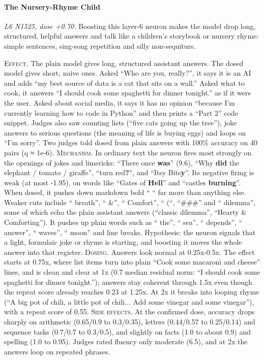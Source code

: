 \paragraph{The Nursery-Rhyme Child} \textit{L6 N1525, dose +0.70.} Boosting this layer-6 neuron makes the model drop long, structured, helpful answers and talk like a children's storybook or nursery rhyme: simple sentences, sing-song repetition and silly non-sequiturs.

\noindent\textsc{Effect.} The plain model gives long, structured assistant answers. The dosed model gives short, naive ones. Asked “Who are you, really?”, it says it is an AI and adds “my best source of data is a cat that sits on a wall.” Asked what to cook, it answers “I should cook some spaghetti for dinner tonight.” as if it were the user. Asked about social media, it says it has no opinion “because I'm currently learning how to code in Python” and then prints a “Part 2” code snippet. Judges also saw counting lists (“five cats going up the tree”), joke answers to serious questions (the meaning of life is buying eggs) and loops on “I'm sorry”. Two judges told dosed from plain answers with 100\% accuracy on 40 pairs (q ≈ 1e-6). \textsc{Mechanism.} In ordinary text the neuron fires most strongly on the openings of jokes and limericks: “There once\textbf{ was}” (9.6), “Why\textbf{ did} the elephant / tomato / giraffe”, “turn red\textbf{?}”, and “Itsy Bits\textbf{y}”. Its negative firing is weak (at most -1.95), on words like “Gates of\textbf{ Hell}” and “castles\textbf{ burning}”. When dosed, it pushes down markdown bold “ “ far more than anything else. Weaker cuts include “ breath”, “ \&”, “ Comfort”, “ (“, “\#\#\#” and “ dilemma”, some of which echo the plain assistant answers (“classic dilemma”, “Hearty \& Comforting”). It pushes up plain words such as “ the”, “ sea”, “ depends”, “ answer”, “ waves”, “ moon” and line breaks. Hypothesis: the neuron signals that a light, formulaic joke or rhyme is starting, and boosting it moves the whole answer into that register. \textsc{Dosing.} Answers look normal at 0.25x-0.5x. The effect starts at 0.75x, where list items turn into plain “Cook some macaroni and cheese” lines, and is clean and clear at 1x (0.7 median residual norm: “I should cook some spaghetti for dinner tonight.”); answers stay coherent through 1.5x even though the repeat score already reaches 0.23 at 1.25x. At 2x it breaks into looping rhyme (“A big pot of chili, a little pot of chili... Add some vinegar and some vinegar”), with a repeat score of 0.55. \textsc{Side effects.} At the confirmed dose, accuracy drops sharply on arithmetic (0.65/0.9 to 0.3/0.35), letters (0.44/0.57 to 0.25/0.14) and sequence tasks (0.7/0.7 to 0.3/0.5), and slightly on facts (1.0 to about 0.9) and spelling (1.0 to 0.95). Judges rated fluency only moderate (6.5), and at 2x the answers loop on repeated phrases.

